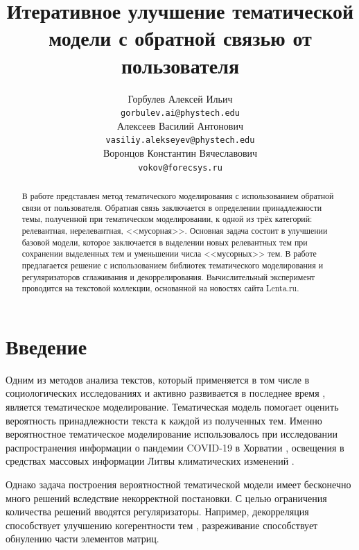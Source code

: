 \documentclass{article}
\title{Итеративное улучшение тематической модели с обратной связью от пользователя}
\author{ Горбулев Алексей Ильич \\
	\texttt{gorbulev.ai@phystech.edu} \\
	\And
	Алексеев Василий Антонович \\
	\texttt{vasiliy.alekseyev@phystech.edu} \\
	\And
    Воронцов Константин Вячеславович \\
    \texttt{vokov@forecsys.ru} \\
}
\date{}
\begin{document}
\maketitle



\begin{abstract}
	В работе представлен метод тематического моделирования с использованием обратной связи от пользователя. Обратная связь заключается в определении принадлежности темы, полученной при тематическом моделировании, к одной из трёх категорий: релевантная, нерелевантная, <<мусорная>>. Основная задача состоит в улучшении базовой модели, которое заключается в выделении новых релевантных тем при сохранении выделенных тем и уменьшении числа <<мусорных>> тем. В работе предлагается решение с использованием библиотек тематического моделирования и регуляризаторов сглаживания и декоррелирования. Вычислительный эксперимент проводится на текстовой коллекции, основанной на новостях сайта Lenta.ru.
\end{abstract}


\section{Введение}
Одним из методов анализа текстов, который применяется в том числе в социологических исследованиях \citep{DIMAGGIO2013570} и активно развивается в последнее время \citep{10031921}, является тематическое моделирование.
Тематическая модель помогает оценить вероятность принадлежности текста к каждой из полученных тем.
Именно вероятностное тематическое моделирование использовалось при исследовании распространения информации о пандемии COVID-19 в Хорватии \citep{pandemic2021}, освещения в средствах массовых информации Литвы климатических изменений \citep{climate2021}.

Однако задача построения вероятностной тематической модели имеет бесконечно много решений \citep{bigartm} вследствие некорректной постановки.
С целью ограничения количества решений вводятся регуляризаторы. 
Например, декорреляция способствует улучшению когерентности тем \citep{artm2}, разреживание способствует обнулению части элементов матриц.
\end{document}
